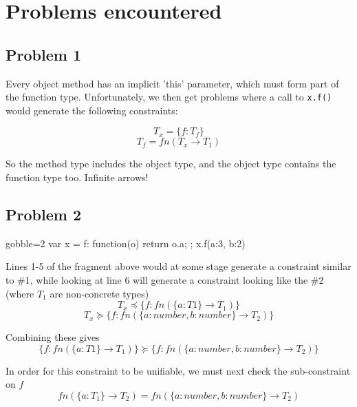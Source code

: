 \documentclass{article}
\begin{document}
\newcommand{\question}[1]{\colchunk{\begin{description}\item[Q:]{#1}%
    \end{description}}}
\newcommand{\answer}[1]{\colchunk{\begin{description}\item[A:]{#1}%
    \end{description}}\colplacechunks}

\section{Problems encountered}

\subsection*{Problem 1}
	
	Every object method has an implicit 'this' parameter, which must form part
	of the function type. Unfortunately, we then get problems where a call to
	\texttt{x.f()} would generate the following constraints:

	$$ T_x = \{f:T_f\}$$
	$$ T_f = fn (T_x \rightarrow T_1)$$

	So the method type includes the object type, and the object type contains
	the function type too. Infinite arrows!

\subsection*{Problem 2}

	\begin{jscode*}{gobble=2}
		var x = {
			f: function(o) {
				return o.a;
			}
		};
		x.f({a:3, b:2})
	\end{jscode*}

	Lines 1-5 of the fragment above would at some stage generate a constraint
	similar to \#1, while looking at line 6 will generate a constraint looking
	like the \#2 (where $T_1$ are non-concrete types)
	$$T_x \preceq \{f:fn(\{a:T1\} \rightarrow T_1 ) \} $$
	$$T_x \succeq{} \{f:fn(\{a:number,b:number\} \rightarrow T_2 ) \} $$

	Combining these gives
	$$\{f:fn(\{a:T1\} \rightarrow T_1)\} \succeq \{f:fn(\{a:number,b:number\} \rightarrow T_2 ) \} $$

	In order for this constraint to be unifiable, we must next check the sub-constraint
	on $f$
	$$fn(\{a:T_1\} \rightarrow T_2) = fn(\{a:number,b:number\} \rightarrow
	T_2)$$
\end{document}
